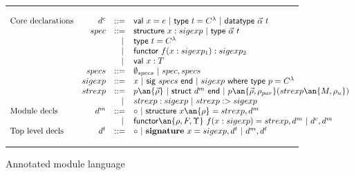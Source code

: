 
\begin{figure}
\hrule
\[
\begin{array}{lrcl}
\textrm{Core declarations} & d^c & ::= & \mathsf{val}~x=e~
|~\mathsf{type}~t=C^\lambda~|~\mathsf{datatype}~\vec{\alpha}~t\\
        & spec & ::= & \mathsf{structure}~x :
        sigexp~|~\mathsf{type}~\vec{\alpha}~t\\
        & & ~~| & \mathsf{type}~t = C^\lambda\\ 
	& & ~~| & \mathsf{functor}~f(x:sigexp_1) : sigexp_2\\
        & & ~~| & \mathsf{val}~x:T\\
        & specs & ::= & \emptyset_{specs}~|~spec, specs\\
	& sigexp & ::= &
        x~|~\mathsf{sig}~specs~\mathsf{end}~|~sigexp~\mathsf{where~
          type}~p=C^\lambda\\
	& strexp & ::= & p\an{\vec{\rho}}~|~\mathsf{struct} ~d^m~\mathsf{end}
        ~|~p\an{\vec{\rho},\rho_{par}}(strexp\an{M,\rho_u})\\
        & & ~~| & strexp:sigexp~|~strexp:>sigexp\\
\textrm{Module decls}	& d^m & ::= & \circ~|~\mathsf{structure}~x\an{\rho} = strexp,
d^m\\
       & & ~~| & \mathsf{functor}\an{\rho,F,\Upsilon}
       ~f(x:sigexp)=strexp, d^m~|~d^c, d^m\\
\textrm{Top level decls} & d^t & ::= & \circ~|~\mathbf{signature}~x=sigexp,d^t~|~d^m,d^t

\end{array}
\]
\hrule
\caption{Annotated module language}
\label{fig:annotatedlang}
\end{figure}

